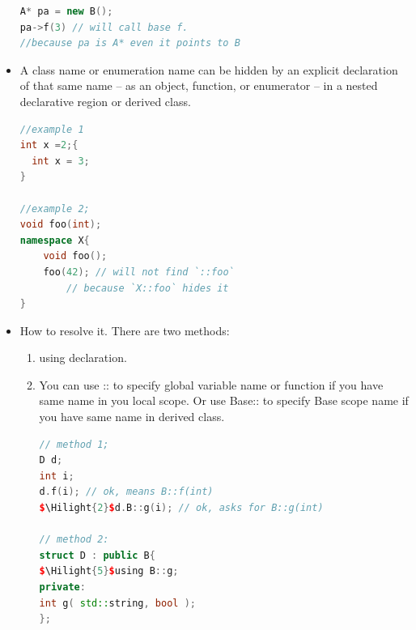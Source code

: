 \documentclass[a4paper,12pt,twoside]{book}
\newcommand{\Hilight}[1]{\makebox[0pt][l]{\color{yellow}\rule[-3pt]{#1em}{11pt}}}
\begin{document}
\begin{itemize}
\begin{lstlisting}[frame=single, language=c++]
A* pa = new B();
pa->f(3) // will call base f.
//because pa is A* even it points to B
\end{lstlisting}

\item A class name or enumeration name can be hidden by an explicit declaration of that same name -- as an object, function, or enumerator -- in a nested declarative region or derived class.

\begin{lstlisting}[frame=single, language=c++]
//example 1
int x =2;{
  int x = 3;
}

//example 2;
void foo(int);
namespace X{
    void foo();
    foo(42); // will not find `::foo`
        // because `X::foo` hides it
}
\end{lstlisting}

\item How to resolve it.  There are two methods:
\begin{enumerate}
\item using declaration.
\item You can use :: to specify global variable name or function if you have same name in you local scope.  Or use Base:: to specify Base scope name if you have same name in derived class.
\begin{lstlisting}[frame=single, language=c++, mathescape=true]
// method 1;
D d;
int i;
d.f(i); // ok, means B::f(int)
$\Hilight{2}$d.B::g(i); // ok, asks for B::g(int)

// method 2:
struct D : public B{
$\Hilight{5}$using B::g;
private:
int g( std::string, bool );
};
\end{lstlisting}

\end{enumerate}

\end{itemize}
\end{document}
